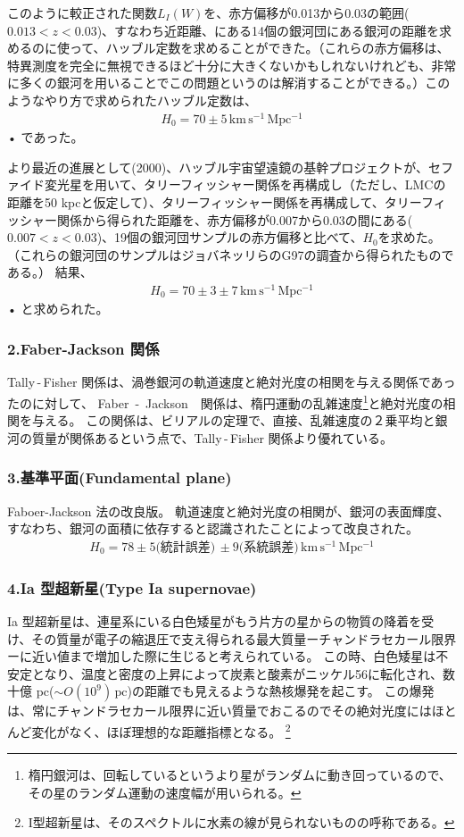 \documentclass[11pt,a4paper,dvipdfmx]{jsarticle}
\theoremstyle{plain}
\theoremstyle{break}
\begin{document}
このように較正された関数$L_I(W)$を、赤方偏移が0.013から0.03の範囲($0.013<z<0.03$)、すなわち近距離、にある14個の銀河団にある銀河の距離を求めるのに使って、ハッブル定数を求めることができた。（これらの赤方偏移は、特異測度を完全に無視できるほど十分に大きくないかもしれないけれども、非常に多くの銀河を用いることでこの問題というのは解消することができる。）このようなやり方で求められたハッブル定数は、
\begin{align}
 H_0 = 70 \pm5 \,\mathrm{km\,s^{-1}\,Mpc^{-1}}
\end{align}•%
であった。

より最近の進展として(2000)、ハッブル宇宙望遠鏡の基幹プロジェクトが、セファイド変光星を用いて、タリーフィッシャー関係を再構成し（ただし、LMCの距離を50 kpcと仮定して）、タリーフィッシャー関係を再構成して、タリーフィッシャー関係から得られた距離を、赤方偏移が0.007から0.03の間にある($0.007<z<0.03$)、19個の銀河団サンプルの赤方偏移と比べて、$H_0$を求めた。
（これらの銀河団のサンプルはジョバネッリらのG97の調査から得られたものである。）
結果、
\begin{align}
 H_0 = 70 \pm3 \pm7 \,\mathrm{km\,s^{-1}\,Mpc^{-1}}
\end{align}•%
と求められた。


\subsubsection*{2.Faber-Jackson 関係}
Tally\,-\,Fisher 関係は、渦巻銀河の軌道速度と絶対光度の相関を与える関係であったのに対して、
Faber \,-\, Jackson　関係は、楕円運動の乱雑速度\footnote{楕円銀河は、回転しているというより星がランダムに動き回っているので、 その星のランダム運動の速度幅が用いられる。}と絶対光度の相関を与える。
この関係は、ビリアルの定理で、直接、乱雑速度の２乗平均と銀河の質量が関係あるという点で、Tally\,-\,Fisher 関係より優れている。

\subsubsection*{3.基準平面(Fundamental plane)}
Faboer-Jackson 法の改良版。
軌道速度と絶対光度の相関が、銀河の表面輝度、すなわち、銀河の面積に依存すると認識されたことによって改良された。
\begin{align}
  H_0 = 78 \pm 5 \text{(統計誤差)} \, \pm 9 \text{(系統誤差)} \, \mathrm{km\,s^{-1}\,Mpc^{-1}}
\end{align}

\subsubsection*{4.Ia 型超新星(Type Ia supernovae)}
Ia 型超新星は、連星系にいる白色矮星がもう片方の星からの物質の降着を受け、その質量が電子の縮退圧で支え得られる最大質量ーチャンドラセカール限界ーに近い値まで増加した際に生じると考えられている。
この時、白色矮星は不安定となり、温度と密度の上昇によって炭素と酸素がニッケル56に転化され、数十億 pc($\sim  O(10^9) \, \mathrm{pc} $)の距離でも見えるような熱核爆発を起こす。
この爆発は、常にチャンドラセカール限界に近い質量でおこるのでその絶対光度にはほとんど変化がなく、ほぼ理想的な距離指標となる。
\footnote{
I型超新星は、そのスペクトルに水素の線が見られないものの呼称である。
}
\end{document}
